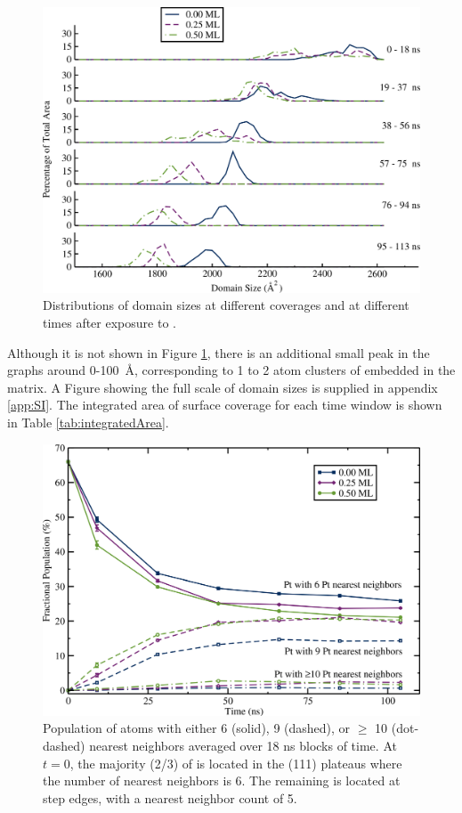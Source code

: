 \begin{figure}[p!]
\centering
\includegraphics[width=\linewidth]{../figures/chap3/domains_Pt_110ns.pdf}
\caption{Distributions of  domain sizes at different 
  coverages and at different times after exposure to .}
\label{fig:domainAreasPt}
\end{figure}

Although it is not shown in Figure \ref{fig:domainAreasPt}, there is
an additional small peak in the  graphs around 0-100~\AA,
corresponding to 1 to 2 atom clusters of  embedded in the
 matrix.  A Figure showing the full scale of domain sizes is
supplied in appendix \ref{app:SI}.  The integrated area of
surface coverage for each time window is shown in Table
\ref{tab:integratedArea}.

\begin{figure}[p!]
\centering
  \includegraphics[width=\linewidth]{../figures/chap3/nn.pdf}
  \caption{Population of  atoms with either 6 (solid), 9
    (dashed), or $\ge$ 10 (dot-dashed)  nearest neighbors
    averaged over 18 ns blocks of time.  At $t=0$, the majority
    (2/3) of  is located in the (111) plateaus where
    the number of  nearest neighbors is 6. The remaining
     is located at step edges, with a nearest neighbor 
    count of 5.} 
\label{fig:nearestNeighbors}
\end{figure}

